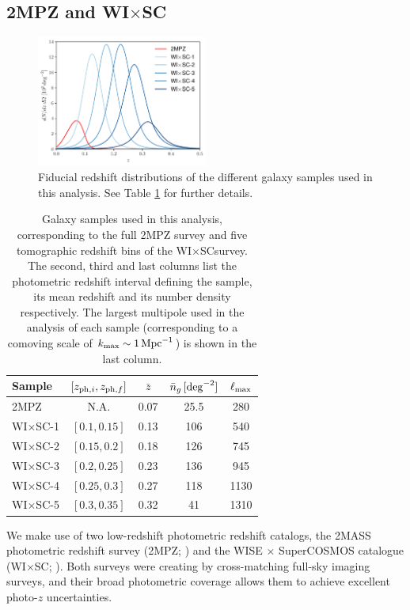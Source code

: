 \documentclass[useAMS,usenatbib]{mn2e}
\newcommand{\wisc}{WI$\times$SC}
\begin{document}
  \subsection{2MPZ and \wisc}\label{ssec:data.g1}
    \begin{figure}
      \centering
      \includegraphics[width=0.5\textwidth]{nzs.pdf}
      \caption{Fiducial redshift distributions of the different galaxy samples used in this analysis. See Table \ref{tab:z_bins} for further details.}
      \label{fig:dndz}
    \end{figure}
    \begin{table}
      \begin{center}
        \begin{tabular}{l|cccc}
          \hline
          Sample & $[z_{{\rm ph},i},z_{{\rm ph},f}]$ & $\bar{z}$ & $\bar{n}_g\,[{\rm deg}^{-2}]$ & $\ell_{\rm max}$\\
          \hline
          2MPZ    & N.A.         & 0.07 &  25.5 &  280 \\
          \wisc-1 & $[0.1,0.15]$ & 0.13 & 106   &  540 \\
          \wisc-2 & $[0.15,0.2]$ & 0.18 & 126   &  745 \\
          \wisc-3 & $[0.2,0.25]$ & 0.23 & 136   &  945 \\
          \wisc-4 & $[0.25,0.3]$ & 0.27 & 118   & 1130 \\
          \wisc-5 & $[0.3,0.35]$ & 0.32 & 41    & 1310 \\
          \hline
        \end{tabular}
        \caption{Galaxy samples used in this analysis, corresponding to the full 2MPZ survey and five tomographic redshift bins of the \wisc survey. The second, third and last columns list the photometric redshift interval defining the sample, its mean redshift and its number density respectively. The largest multipole used in the analysis of each sample (corresponding to a comoving scale of $k_{\rm max}\sim 1\,{\rm Mpc}^{-1}$) is shown in the last column.}\label{tab:z_bins}
      \end{center}
    \end{table} 
    We make use of two low-redshift photometric redshift catalogs, the 2MASS photometric redshift survey (2MPZ; \cite{2014ApJS..210....9B}) and the WISE $\times$ SuperCOSMOS catalogue (\wisc; \cite{2016ApJS..225....5B}). Both surveys were creating by cross-matching full-sky imaging surveys, and their broad photometric coverage allows them to achieve excellent photo-$z$ uncertainties.
    
\end{document}
